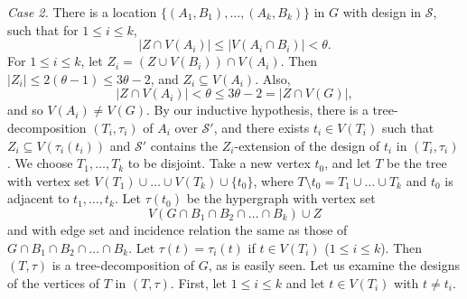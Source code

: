 \textit{Case 2.} There is a location $\{(A_1, B_1), \dots, (A_k, B_k)\}$ in $G$ with design in $\mathscr{S}$, such that for $1 \le i \le k$,
\begin{equation*}
|Z \cap V(A_i)| \le |V(A_i \cap B_i)| < \theta.
\end{equation*}
For $1 \le i \le k$, let $Z_i = (Z \cup V(B_i)) \cap V(A_i)$. Then $|Z_i| \le 2(\theta - 1) \le 3\theta - 2$, and $Z_i \subseteq V(A_i)$. Also,
\begin{equation*}
|Z \cap V(A_i)| < \theta \le 3\theta - 2 = |Z \cap V(G)|,
\end{equation*}
and so $V(A_i) \ne V(G)$. By our inductive hypothesis, there is a tree-decomposition $(T_i, \tau_i)$ of $A_i$ over $\mathscr{S}'$, and there exists $t_i \in V(T_i)$ such that $Z_i \subseteq V(\tau_i(t_i))$ and $\mathscr{S}'$ contains the $Z_i$-extension of the design of $t_i$ in $(T_i, \tau_i)$. We choose $T_1, \dots, T_k$ to be disjoint. Take a new vertex $t_0$, and let $T$ be the tree with vertex set $V(T_1) \cup \dots \cup V(T_k) \cup \{t_0\}$, where $T \setminus t_0 = T_1 \cup \dots \cup T_k$ and $t_0$ is adjacent to $t_1, \dots, t_k$. Let $\tau(t_0)$ be the hypergraph with vertex set
\begin{equation*}
V(G \cap B_1 \cap B_2 \cap \dots \cap B_k) \cup Z
\end{equation*}
and with edge set and incidence relation the same as those of $G \cap B_1 \cap B_2 \cap \dots \cap B_k$. Let $\tau(t) = \tau_i(t)$ if $t \in V(T_i)$ ($1 \le i \le k$). Then $(T, \tau)$ is a tree-decomposition of $G$, as is easily seen. Let us examine the designs of the vertices of $T$ in $(T, \tau)$. First, let $1 \le i \le k$ and let $t \in V(T_i)$ with $t \ne t_i$.
